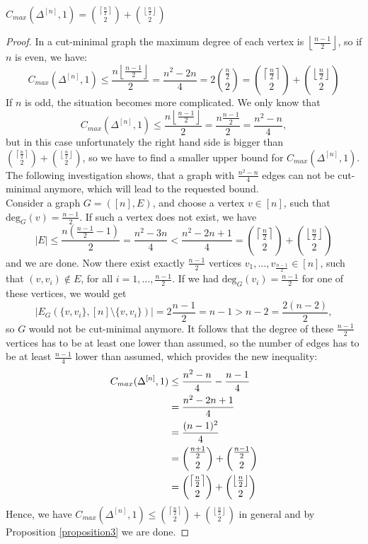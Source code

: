 \begin{thm}\label{theorem1}
\(C_{max}(\Delta^{[n]},1)=\binom{\left\lceil\frac{n}{2}\right\rceil}{2}+\binom{\left\lfloor\frac{n}{2}\right\rfloor}{2}\)
\begin{proof}
In a cut-minimal graph the maximum degree of each vertex is \(\left\lfloor\frac{n-1}{2}\right\rfloor\), so if \(n\) is even, we have:
\[
C_{max}(\Delta^{[n]},1)\leq\frac{n\left\lfloor\frac{n-1}{2}\right\rfloor}{2}=\frac{n^2-2n}{4}=2\binom{\frac{n}{2}}{2}=\binom{\left\lceil\frac{n}{2}\right\rceil}{2}+\binom{\left\lfloor\frac{n}{2}\right\rfloor}{2}
\]
If \(n\) is odd, the situation becomes more complicated. We only know that
\[
C_{max}(\Delta^{[n]},1)\leq\frac{n\left\lfloor\frac{n-1}{2}\right\rfloor}{2}=\frac{n\frac{n-1}{2}}{2}=\frac{n^2-n}{4},
\]
but in this case unfortunately the right hand side is bigger than \(\binom{\left\lceil\frac{n}{2}\right\rceil}{2}+\binom{\left\lfloor\frac{n}{2}\right\rfloor}{2}\), so we have to find a smaller upper bound for \(C_{max}(\Delta^{[n]},1)\). The following investigation shows, that a graph with \(\frac{n^2-n}{4}\) edges can not be cut-minimal anymore, which will lead to the requested bound.\\
Consider a graph \(G=([n],E)\), and choose a vertex \(v\in [n]\), such that\\
\(\text{deg}_G(v)=\frac{n-1}{2}\). If such a vertex does not exist, we have
\[
|E|\leq\frac{n(\frac{n-1}{2}-1)}{2}=\frac{n^2-3n}{4}<\frac{n^2-2n+1}{4}=\binom{\left\lceil\frac{n}{2}\right\rceil}{2}+\binom{\left\lfloor\frac{n}{2}\right\rfloor}{2}
\]
and we are done. Now there exist exactly \(\frac{n-1}{2}\) vertices \(v_1,\ldots,v_{\frac{n-1}{2}}\in [n]\), such that \((v,v_i)\notin E\), for all \(i=1,\ldots,\frac{n-1}{2}\). If we had \(\text{deg}_G(v_i)=\frac{n-1}{2}\) for one of these vertices, we would get
\[
|E_G(\{v,v_i\},[n]\setminus\{v,v_i\})|=2\frac{n-1}{2}=n-1>n-2=\frac{2(n-2)}{2},
\]
so \(G\) would not be cut-minimal anymore. It follows that the degree of these \(\frac{n-1}{2}\) vertices has to be at least one lower than assumed, so the number of edges has to be at least \(\frac{n-1}{4}\) lower than assumed, which provides the new inequality:
\begin{align}
C_{max}(\Delta^{[n]},1)&\leq\frac{n^2-n}{4}-\frac{n-1}{4}\notag\\
&=\frac{n^2-2n+1}{4}\notag\\
&=\frac{(n-1)^2}{4}\notag\\
&=\binom{\frac{n+1}{2}}{2}+\binom{\frac{n-1}{2}}{2}\notag\\
&=\binom{\left\lceil\frac{n}{2}\right\rceil}{2}+\binom{\left\lfloor\frac{n}{2}\right\rfloor}{2}\notag
\end{align}
Hence, we have \(C_{max}(\Delta^{[n]},1)\leq\binom{\left\lceil\frac{n}{2}\right\rceil}{2}+\binom{\left\lfloor\frac{n}{2}\right\rfloor}{2}\) in general and by Proposition \ref{proposition3} we are done.
\end{proof}
\end{thm}
